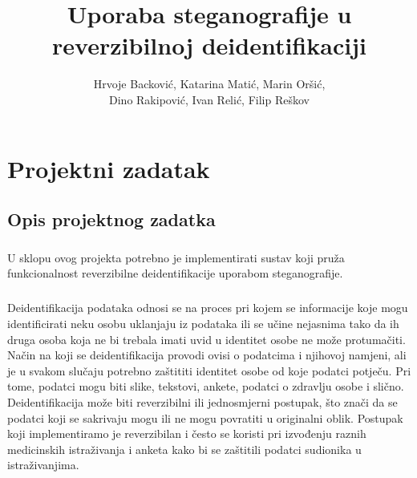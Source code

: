 \documentclass[times, utf8, seminar, numeric]{fer}
\begin{document}
\nocite{*}
\title{Uporaba steganografije u reverzibilnoj deidentifikaciji}

\author{	
	Hrvoje Backović,
	Katarina Matić,
	Marin Oršić,\\
	Dino Rakipović,
	Ivan Relić,
	Filip Reškov	}



\maketitle

\tableofcontents

\chapter{Projektni zadatak}
\section{Opis projektnog zadatka}

\paragraph{}
U sklopu ovog projekta potrebno je implementirati sustav koji pruža funkcionalnost reverzibilne deidentifikacije uporabom steganografije.
\paragraph{}
Deidentifikacija podataka odnosi se na proces pri kojem se informacije koje mogu identificirati neku osobu uklanjaju iz podataka ili se učine nejasnima tako da ih druga osoba koja ne bi trebala imati uvid u identitet osobe ne može protumačiti. Način na koji se deidentifikacija provodi ovisi o podatcima i njihovoj namjeni, ali je u svakom slučaju potrebno zaštititi identitet osobe od koje podatci potječu. Pri tome, podatci mogu biti slike, tekstovi, ankete, podatci o zdravlju osobe i slično. Deidentifikacija može biti reverzibilni ili jednosmjerni postupak, što znači  da se podatci koji se sakrivaju mogu ili ne mogu povratiti u originalni oblik. Postupak koji implementiramo je reverzibilan i često se koristi pri izvođenju raznih medicinskih istraživanja i anketa kako bi se zaštitili podatci sudionika u istraživanjima.
\end{document}
